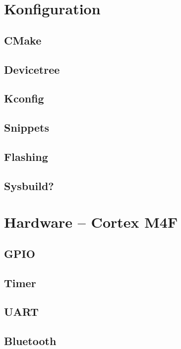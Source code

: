 \section{Konfiguration}

\subsection{CMake}

\subsection{Devicetree}

\subsection{Kconfig}

\subsection{Snippets}

\subsection{Flashing}

\subsection{Sysbuild?}

\section{Hardware – Cortex M4F}

\subsection{GPIO}

\subsection{Timer}

\subsection{UART}

\subsection{Bluetooth}

